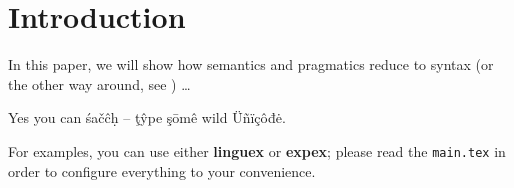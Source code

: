 



\section{Introduction}\label{sec:1}

In this paper, we will show how semantics and pragmatics reduce to
syntax (or the other way around, see \citealt{Kamp:1973,Searle:1964}) \ldots 

Yes you can śačĉḥ -- ţŷpe şōmê wild Üñïçôđė.

For examples, you can use either \textbf{linguex} or \textbf{expex}; please read the \texttt{main.tex} in order to configure everything to your convenience.


